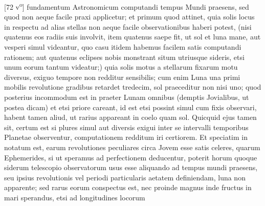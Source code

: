 [72 v\textsuperscript{o}] fundamentum Astronomicum computandi tempus Mundi praesens, sed quod non aeque facile praxi applicetur; et primum quod \protect{} attinet,   quia solis\protect{} locus in respectu ad alias stellas\protect{} non aeque facile observationibus haberi potest, (nisi quatenus eos radiis suis involvit, item quatenus saepe fit, ut sol\protect{} et luna\protect{} mane, aut vesperi simul videantur, quo casu itidem habemus facilem satis computandi rationem; aut quatenus eclipses nobis monstrant situm utriusque sideris\protect{}, etsi unum eorum tantum videatur;)  quia solis motus a stellarum fixarum\protect{} motu diversus, exiguo tempore non redditur sensibilis; cum enim Luna\protect{} una primi mobilis revolutione gradibus retardet tredecim, sol\protect{} praeceditur non nisi uno; quod posterius incommodum est in  praeter Lunam\protect{} omnibus (demptis  Jovialibus, ut postea  dicam) et etsi priore careant, id est etsi possint simul cum fixis\protect{} observari, habent tamen aliud, ut rarius appareant in coelo quam sol\protect{}. Quicquid ejus tamen sit, certum est si plures simul aut diversis exigui inter se intervalli temporibus Planetae observentur, computationem redditum iri certiorem. Et speciatim in  notatum est, earum revolutiones peculiares circa Jovem\protect{} esse satis celeres, quarum Ephemerides\protect{}, si ut speramus ad perfectionem deducentur, poterit horum quoque siderum\protect{} telescopio\protect{} observatorum usus esse aliquando ad tempus mundi praesens, seu ipsius revolutionis vel periodi particularis aetatem definiendam, luna\protect{} non apparente; sed rarus eorum conspectus est, nec proinde magnus inde fructus in mari sperandus, etsi ad longitudines\protect{} locorum 
